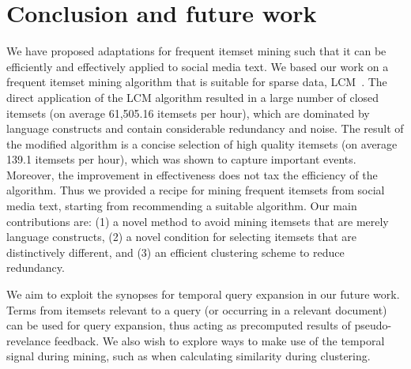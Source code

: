 \documentclass{sig-alternate}
\begin{document}
\section{Conclusion and future work}
\label{sec:concfut}
We have proposed adaptations for frequent itemset mining 
such that it can be efficiently and effectively applied to 
social media text.
We based our work on a frequent itemset mining algorithm that is suitable
for sparse data, LCM~\cite{uno2004lcm}.
The direct application of the LCM algorithm resulted 
in a large number of closed itemsets (on average 61,505.16 itemsets 
per hour),
which are dominated by language constructs
and contain considerable redundancy and noise.
The result of the modified algorithm is a concise selection of
high quality itemsets (on average 139.1 itemsets 
per hour),
which was shown to capture important events.
Moreover, the improvement in effectiveness does not tax
the efficiency of the algorithm.
Thus we provided a recipe for mining frequent itemsets
from social media text, starting from recommending
a suitable algorithm. Our main contributions are: 
(1) a novel method to avoid mining itemsets that are 
merely language constructs,
(2) a novel condition for selecting itemsets that are distinctively different, and
(3) an efficient clustering scheme to reduce redundancy.

We aim to exploit the synopses for temporal query expansion in our future work. Terms from itemsets relevant to a query (or occurring in a relevant document)
can be used for query expansion, thus acting as precomputed results of 
pseudo-revelance feedback.
We also wish to explore ways to make use of the temporal signal during mining,
such as when calculating similarity during clustering.

 



\small

%
%
\end{document}
